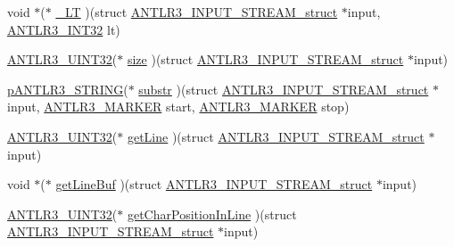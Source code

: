 \begin{DoxyCompactItemize}
\item 
void $\ast$($\ast$ \hyperlink{struct_a_n_t_l_r3___i_n_p_u_t___s_t_r_e_a_m__struct_a20b41f8c004bb0183ed4c7f9bb6502aa}{\-\_\-\-L\-T} )(struct \hyperlink{struct_a_n_t_l_r3___i_n_p_u_t___s_t_r_e_a_m__struct}{A\-N\-T\-L\-R3\-\_\-\-I\-N\-P\-U\-T\-\_\-\-S\-T\-R\-E\-A\-M\-\_\-struct} $\ast$input, \hyperlink{antlr3defs_8h_a6faef5c4687f8eb633d2aefea93973ca}{A\-N\-T\-L\-R3\-\_\-\-I\-N\-T32} lt)
\item 
\hyperlink{antlr3defs_8h_ac41f744abd0fd25144b9eb9d11b1dfd1}{A\-N\-T\-L\-R3\-\_\-\-U\-I\-N\-T32}($\ast$ \hyperlink{struct_a_n_t_l_r3___i_n_p_u_t___s_t_r_e_a_m__struct_a52014f7dacdfa801db4c20a24a08f5b7}{size} )(struct \hyperlink{struct_a_n_t_l_r3___i_n_p_u_t___s_t_r_e_a_m__struct}{A\-N\-T\-L\-R3\-\_\-\-I\-N\-P\-U\-T\-\_\-\-S\-T\-R\-E\-A\-M\-\_\-struct} $\ast$input)
\item 
\hyperlink{antlr3interfaces_8h_a36bbe7362079348864db4b4dbdcce56b}{p\-A\-N\-T\-L\-R3\-\_\-\-S\-T\-R\-I\-N\-G}($\ast$ \hyperlink{struct_a_n_t_l_r3___i_n_p_u_t___s_t_r_e_a_m__struct_aa5328318fdaba5a203bd15a7136b8594}{substr} )(struct \hyperlink{struct_a_n_t_l_r3___i_n_p_u_t___s_t_r_e_a_m__struct}{A\-N\-T\-L\-R3\-\_\-\-I\-N\-P\-U\-T\-\_\-\-S\-T\-R\-E\-A\-M\-\_\-struct} $\ast$input, \hyperlink{antlr3defs_8h_a0361e6bf442e07afe923e4d05e9ebc4f}{A\-N\-T\-L\-R3\-\_\-\-M\-A\-R\-K\-E\-R} start, \hyperlink{antlr3defs_8h_a0361e6bf442e07afe923e4d05e9ebc4f}{A\-N\-T\-L\-R3\-\_\-\-M\-A\-R\-K\-E\-R} stop)
\item 
\hyperlink{antlr3defs_8h_ac41f744abd0fd25144b9eb9d11b1dfd1}{A\-N\-T\-L\-R3\-\_\-\-U\-I\-N\-T32}($\ast$ \hyperlink{struct_a_n_t_l_r3___i_n_p_u_t___s_t_r_e_a_m__struct_a9bf0bff9acd4e32f08c8f57938d062aa}{get\-Line} )(struct \hyperlink{struct_a_n_t_l_r3___i_n_p_u_t___s_t_r_e_a_m__struct}{A\-N\-T\-L\-R3\-\_\-\-I\-N\-P\-U\-T\-\_\-\-S\-T\-R\-E\-A\-M\-\_\-struct} $\ast$input)
\item 
void $\ast$($\ast$ \hyperlink{struct_a_n_t_l_r3___i_n_p_u_t___s_t_r_e_a_m__struct_ac54c9d30cefd8256ea68d2d044ec4395}{get\-Line\-Buf} )(struct \hyperlink{struct_a_n_t_l_r3___i_n_p_u_t___s_t_r_e_a_m__struct}{A\-N\-T\-L\-R3\-\_\-\-I\-N\-P\-U\-T\-\_\-\-S\-T\-R\-E\-A\-M\-\_\-struct} $\ast$input)
\item 
\hyperlink{antlr3defs_8h_ac41f744abd0fd25144b9eb9d11b1dfd1}{A\-N\-T\-L\-R3\-\_\-\-U\-I\-N\-T32}($\ast$ \hyperlink{struct_a_n_t_l_r3___i_n_p_u_t___s_t_r_e_a_m__struct_a1a12fe9fd03a2057c1956c5063c8d7b3}{get\-Char\-Position\-In\-Line} )(struct \hyperlink{struct_a_n_t_l_r3___i_n_p_u_t___s_t_r_e_a_m__struct}{A\-N\-T\-L\-R3\-\_\-\-I\-N\-P\-U\-T\-\_\-\-S\-T\-R\-E\-A\-M\-\_\-struct} $\ast$input)

\end{DoxyCompactItemize}
